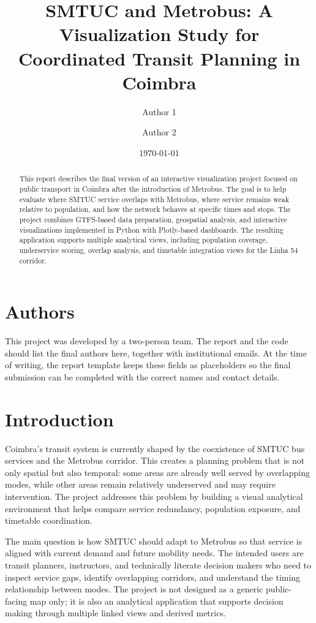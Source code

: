 \documentclass[11pt,a4paper]{article}
\title{SMTUC and Metrobus: A Visualization Study for Coordinated Transit Planning in Coimbra}
\author{Author 1 \and Author 2}
\date{\today}
\begin{document}
\maketitle

\begin{abstract}
This report describes the final version of an interactive visualization project focused on public transport in Coimbra after the introduction of Metrobus. The goal is to help evaluate where SMTUC service overlaps with Metrobus, where service remains weak relative to population, and how the network behaves at specific times and stops. The project combines GTFS-based data preparation, geospatial analysis, and interactive visualizations implemented in Python with Plotly-based dashboards. The resulting application supports multiple analytical views, including population coverage, underservice scoring, overlap analysis, and timetable integration views for the Linha 54 corridor.
\end{abstract}

\section{Authors}
This project was developed by a two-person team. The report and the code should list the final authors here, together with institutional emails. At the time of writing, the report template keeps these fields as placeholders so the final submission can be completed with the correct names and contact details.

\section{Introduction}
Coimbra's transit system is currently shaped by the coexistence of SMTUC bus services and the Metrobus corridor. This creates a planning problem that is not only spatial but also temporal: some areas are already well served by overlapping modes, while other areas remain relatively underserved and may require intervention. The project addresses this problem by building a visual analytical environment that helps compare service redundancy, population exposure, and timetable coordination.

The main question is how SMTUC should adapt to Metrobus so that service is aligned with current demand and future mobility needs. The intended users are transit planners, instructors, and technically literate decision makers who need to inspect service gaps, identify overlapping corridors, and understand the timing relationship between modes. The project is not designed as a generic public-facing map only; it is also an analytical application that supports decision making through multiple linked views and derived metrics.
\end{document}
